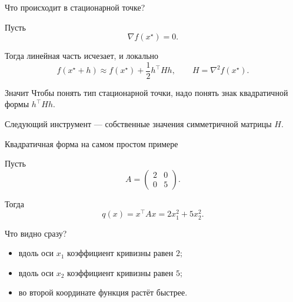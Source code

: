 \documentclass[aspectratio=169,10pt]{beamer}
\newcommand{\grad}{\nabla}
\newcommand{\Hess}{\nabla^2}
\begin{document}
\begin{frame}{Что происходит в стационарной точке?}
\vspace{0.45em}

Пусть
\[
  \grad f(x^\star)=0.
\]

Тогда линейная часть исчезает, и локально
\[
  f(x^\star+h)
  \approx
  f(x^\star)
  +\frac12h^\top Hh,
  \qquad
  H=\Hess f(x^\star).
\]

\begin{alertblock}{Значит}
\centering
Чтобы понять тип стационарной точки, надо понять знак квадратичной формы $h^\top Hh$.
\end{alertblock}

Следующий инструмент --- собственные значения симметричной матрицы $H$.

\end{frame}

\begin{frame}{Квадратичная форма на самом простом примере}
\vspace{0.45em}

Пусть
\[
  A=
  \begin{pmatrix}
   2&0\\
   0&5
  \end{pmatrix}.
\]

Тогда
\[
  q(x)=x^\top Ax=2x_1^2+5x_2^2.
\]

\begin{block}{Что видно сразу?}
\begin{itemize}
  \item вдоль оси $x_1$ коэффициент кривизны равен $2$;
  \item вдоль оси $x_2$ коэффициент кривизны равен $5$;
  \item во второй координате функция растёт быстрее.
\end{itemize}
\end{block}

\end{frame}
\end{document}
